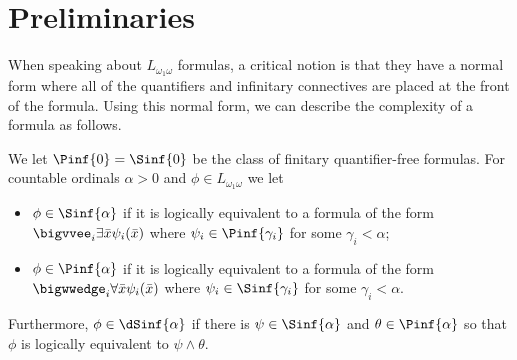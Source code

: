 \documentclass{amsart}
\renewcommand{\-}{\text{-}}
\begin{document}
\section{Preliminaries}
When speaking about $L_{\omega_1\omega}$ formulas, a critical notion is that they have a normal form where all of the quantifiers and infinitary connectives are placed at the front of the formula.
Using this normal form, we can describe the complexity of a formula as follows.

\begin{definition}
	We let $\Pinf{0}=\Sinf{0}$ be the class of finitary quantifier-free formulas. For countable ordinals $\alpha>0$ and $\phi\in L_{\omega_1\omega}$ we let 
	\begin{itemize}
		\item $\phi\in \Sinf{\alpha}$ if it is logically equivalent to a formula of the form $\bigvvee_i \exists \bar x\psi_i(\bar x)$ where $\psi_i\in \Pinf{\gamma_i}$ for some $\gamma_i<\alpha$;
		\item $\phi\in \Pinf{\alpha}$ if it is logically equivalent to a formula of the form $\bigwwedge_i \forall\bar x\psi_i(\bar x)$ where $\psi_i\in \Sinf{\gamma_i}$ for some $\gamma_i<\alpha$.
	\end{itemize}
	Furthermore, $\phi\in \dSinf{\alpha}$ if there is $\psi\in \Sinf{\alpha}$ and $\theta\in \Pinf{\alpha}$ so that $\phi$ is logically equivalent to $\psi\land \theta$.
\end{definition}
\end{document}
